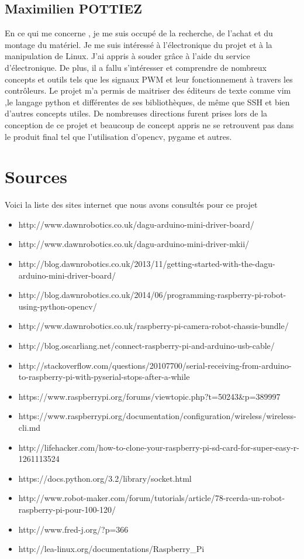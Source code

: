 \documentclass[12pt,a4paper]{report}
\begin{document}
\section{Maximilien POTTIEZ}

En ce qui me concerne , je me suis occupé de la recherche, de l'achat et du montage du matériel.
Je me suis intéressé à l'électronique du projet et à la manipulation de Linux.
J'ai appris à souder grâce à l'aide du service d'électronique. 
De plus, il a fallu s'intéresser et comprendre de nombreux concepts et outils tels que les signaux PWM et leur fonctionnement à travers les contrôleurs.
Le projet m'a permis de maitriser des éditeurs de texte comme vim ,le langage python et différentes de ses bibliothèques, de même que SSH et bien d'autres concepts utiles.
De nombreuses directions furent prises lors de la conception de ce projet et beaucoup de concept appris ne se retrouvent pas dans le produit final tel que l'utilisation d'opencv, pygame et autres.

\chapter{Sources}

Voici la liste des sites internet que nous avons consultés pour ce projet

\begin{itemize}
\item http://www.dawnrobotics.co.uk/dagu-arduino-mini-driver-board/
\item http://www.dawnrobotics.co.uk/dagu-arduino-mini-driver-mkii/
\item http://blog.dawnrobotics.co.uk/2013/11/getting-started-with-the-dagu-arduino-mini-driver-board/
\item http://blog.dawnrobotics.co.uk/2014/06/programming-raspberry-pi-robot-using-python-opencv/
\item http://www.dawnrobotics.co.uk/raspberry-pi-camera-robot-chassis-bundle/
\item http://blog.oscarliang.net/connect-raspberry-pi-and-arduino-usb-cable/
\item http://stackoverflow.com/questions/20107700/serial-receiving-from-arduino-to-raspberry-pi-with-pyserial-stops-after-a-while
\item https://www.raspberrypi.org/forums/viewtopic.php?t=50243\&p=389997
\item https://www.raspberrypi.org/documentation/configuration/wireless/wireless-cli.md
\item http://lifehacker.com/how-to-clone-your-raspberry-pi-sd-card-for-super-easy-r-1261113524
\item https://docs.python.org/3.2/library/socket.html
\item http://www.robot-maker.com/forum/tutorials/article/78-rcerda-un-robot-raspberry-pi-pour-100-120/
\item http://www.fred-j.org/?p=366
\item http://lea-linux.org/documentations/Raspberry\_Pi
\end{itemize}
\end{document}
